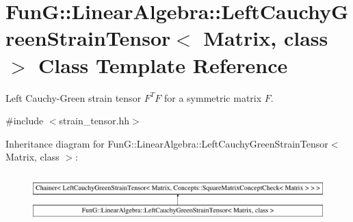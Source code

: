 \hypertarget{classFunG_1_1LinearAlgebra_1_1LeftCauchyGreenStrainTensor}{}\section{Fun\+G\+:\+:Linear\+Algebra\+:\+:Left\+Cauchy\+Green\+Strain\+Tensor$<$ Matrix, class $>$ Class Template Reference}
\label{classFunG_1_1LinearAlgebra_1_1LeftCauchyGreenStrainTensor}


Left Cauchy-\/\+Green strain tensor $ F^T F $ for a symmetric matrix $ F $.  




{\ttfamily \#include $<$strain\+\_\+tensor.\+hh$>$}

Inheritance diagram for Fun\+G\+:\+:Linear\+Algebra\+:\+:Left\+Cauchy\+Green\+Strain\+Tensor$<$ Matrix, class $>$\+:\begin{figure}[H]
\begin{center}
\leavevmode
\includegraphics[height=1.851240cm]{classFunG_1_1LinearAlgebra_1_1LeftCauchyGreenStrainTensor}
\end{center}
\end{figure}
